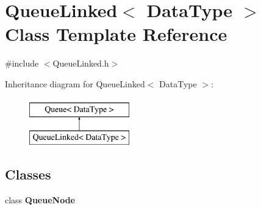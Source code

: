 \hypertarget{class_queue_linked}{\section{\-Queue\-Linked$<$ \-Data\-Type $>$ \-Class \-Template \-Reference}
\label{class_queue_linked}
}


{\ttfamily \#include $<$\-Queue\-Linked.\-h$>$}

\-Inheritance diagram for \-Queue\-Linked$<$ \-Data\-Type $>$\-:\begin{figure}[H]
\begin{center}
\leavevmode
\includegraphics[height=2.000000cm]{class_queue_linked}
\end{center}
\end{figure}
\subsection*{\-Classes}
\begin{DoxyCompactItemize}
\item 
class {\bfseries \-Queue\-Node}
\end{DoxyCompactItemize}
